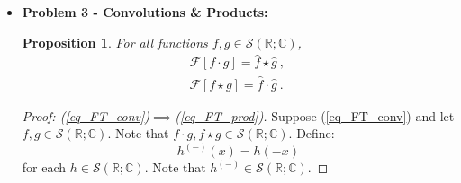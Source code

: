 \documentclass[12pt, reqno]{amsart}
\newtheorem{prop}{Proposition}[section]
\theoremstyle{definition}
\theoremstyle{remark}
\begin{document}
\begin{itemize}
\vspace{0.2 cm}
\item {\bf{Problem 3 - Convolutions \& Products:}} %


\begin{prop}
    For all functions $f,g\in\mathcal{S}(\mathbb{R;C})$, 
\begin{align}
\mathcal{F}[f \cdot g] = \widehat{f} \star \widehat{g} ~\mbox{, } \label{eq_FT_prod} \\
\mathcal{F}[f \star g] = \widehat{f} \cdot \widehat{g} ~\mbox{. } \label{eq_FT_conv}
\end{align}
\end{prop}

\begin{proof}[Proof: (\ref{eq_FT_conv})$\implies$(\ref{eq_FT_prod})]
    Suppose (\ref{eq_FT_conv}) and let $f,g\in\mathcal{S}(\mathbb{R};\mathbb{C})$. Note that $f\cdot g,f\star g\in\mathcal{S}(\mathbb{R};\mathbb{C})$. Define:
$$h^{(-)}(x)=h(-x)$$for each $h\in\mathcal{S}(\mathbb{R};\mathbb{C})$. Note that $h^{(-)}\in\mathcal{S}(\mathbb{R};\mathbb{C})$.


\end{proof}
\end{itemize}
\end{document}
